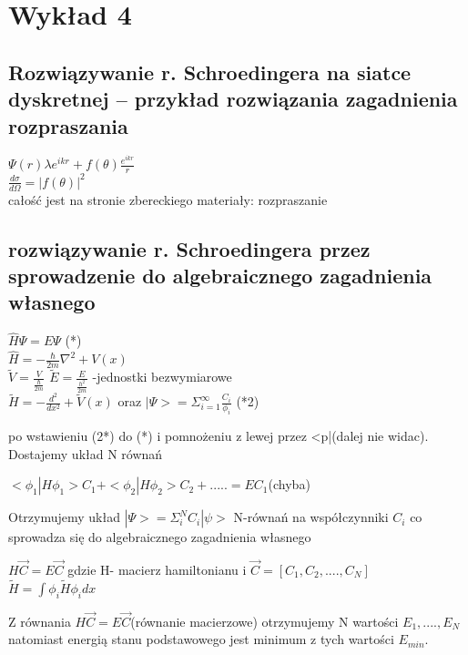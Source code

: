 \documentclass{article}
\begin{document}
		\section{Wykład 4}
		\subsection{Rozwiązywanie r. Schroedingera na siatce dyskretnej –	przykład rozwiązania zagadnienia rozpraszania}
		\begin{center}
			$ \Psi (r) \lambda e^{ikr}+f(\theta)\frac{e^{ikr}}{r}$ \\
			$\frac{d\sigma}{d\Omega}=|f(\theta)|^{2}$ \\
			
			całość jest na stronie zbereckiego materiały: rozpraszanie
		\end{center}
		\subsection{rozwiązywanie r. Schroedingera przez sprowadzenie do algebraicznego zagadnienia własnego}
		\begin{center}
			$ \hat{H} \Psi = E\Psi $  (*) \\
			$ \hat{H} = -\frac{\hbar}{2m}\nabla ^{2}+V(x)$\\
			$ \tilde{V}=\frac{V}{\frac{\hbar}{2m}}$ $\tilde{E}=\frac{E}{\frac{h^{2}}{2m}}$ -jednostki bezwymiarowe \\
			$\tilde{H}=-\frac{d^{2}}{dx^{2}}+\tilde{V}(x) $ oraz   $|\Psi> = \Sigma _{i=1}^{\infty} \frac{C_{i}}{\phi _{i}}$ (*2)\\	
		\end{center}
		po wstawieniu (2*) do (*) i pomnożeniu z lewej przez <p|(dalej nie widac). Dostajemy układ  N równań\\
		\begin{center}  
			$<\phi_{1}|H\phi_{1}> C_{1} + <\phi_{2}|H\phi_{2}> C_{2} +..... = E C_{1}$(chyba)\\
		\end{center}
		Otrzymujemy układ $|\Psi>= \Sigma_{i}^{N} C_{i}|\psi>$ N-równań  na współczynniki $C_{i}$ co sprowadza się do algebraicznego zagadnienia własnego \\
		\begin{center}
			$H\vec{C}=E\vec{C}$ gdzie H- macierz hamiltonianu i $\vec{C}=[C_{1},C_{2},....,C_{N}]$ \\
			$ \tilde{H}=\int \phi_{i} \tilde{H} \phi_{i}dx$\\
		\end{center}
		Z równania 	$H\vec{C}=E\vec{C}$(równanie macierzowe) otrzymujemy N wartości $E_{1},....,E_{N}$ natomiast energią stanu podstawowego jest minimum z tych wartości $E_{min}$.
\end{document}
